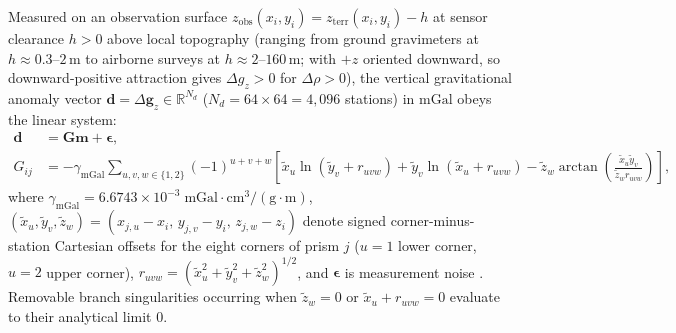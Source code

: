 \documentclass[11pt,a4paper]{article}
\begin{document}
Measured on an observation surface $z_{\mathrm{obs}}(x_i, y_i) = z_{\mathrm{terr}}(x_i, y_i) - h$ at sensor clearance $h > 0$ above local topography (ranging from ground gravimeters at $h \approx 0.3\text{--}2$\,m to airborne surveys at $h \approx 2\text{--}160$\,m; with $+z$ oriented downward, so downward-positive attraction gives $\Delta g_z > 0$ for $\Delta\rho > 0$), the vertical gravitational anomaly vector $\mathbf{d} = \Delta\mathbf{g}_z \in \mathbb{R}^{N_d}$ ($N_d = 64 \times 64 = 4{,}096$ stations) in $\text{mGal}$ obeys the linear system:
\begin{equation}
\begin{aligned}
  \mathbf{d} &= \mathbf{G}\mathbf{m} + \boldsymbol{\epsilon}, \\
  G_{ij} &= -\gamma_{\mathrm{mGal}} \sum_{u,v,w \in \{1,2\}} (-1)^{u+v+w}
  \left[
    \tilde{x}_u \ln(\tilde{y}_v + r_{uvw}) + \tilde{y}_v \ln(\tilde{x}_u + r_{uvw})
    - \tilde{z}_w \arctan\!\left(\frac{\tilde{x}_u \tilde{y}_v}{\tilde{z}_w r_{uvw}}\right)
  \right],
\end{aligned}
  \label{eq:forward_nagy}
\end{equation}
where $\gamma_{\mathrm{mGal}} = 6.6743 \times 10^{-3}\;\text{mGal}\cdot\text{cm}^3/(\text{g}\cdot\text{m})$, $(\tilde{x}_u, \tilde{y}_v, \tilde{z}_w) = (x_{j,u}-x_i,\, y_{j,v}-y_i,\, z_{j,w}-z_i)$ denote signed corner-minus-station Cartesian offsets for the eight corners of prism $j$ ($u=1$ lower corner, $u=2$ upper corner), $r_{uvw} = (\tilde{x}_u^2 + \tilde{y}_v^2 + \tilde{z}_w^2)^{1/2}$, and $\boldsymbol{\epsilon}$ is measurement noise \citep{nagy1966,blakely1995}. Removable branch singularities occurring when $\tilde{z}_w = 0$ or $\tilde{x}_u + r_{uvw} = 0$ evaluate to their analytical limit $0$.
\end{document}
